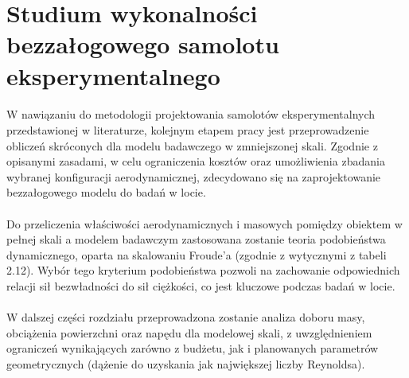 \clearpage
\section{Studium wykonalności bezzałogowego samolotu eksperymentalnego}
    \paragraph{}
        W nawiązaniu do metodologii projektowania samolotów eksperymentalnych przedstawionej w literaturze, 
        kolejnym etapem pracy jest przeprowadzenie obliczeń skróconych dla modelu badawczego w zmniejszonej skali. 
        Zgodnie z opisanymi zasadami, w celu ograniczenia kosztów oraz umożliwienia zbadania wybranej konfiguracji aerodynamicznej, 
        zdecydowano się na zaprojektowanie bezzałogowego modelu do badań w locie.
    \paragraph{}
        Do przeliczenia właściwości aerodynamicznych i masowych pomiędzy obiektem w pełnej skali 
        a modelem badawczym zastosowana zostanie teoria podobieństwa dynamicznego, oparta na skalowaniu Froude’a 
        (zgodnie z wytycznymi z tabeli 2.12). 
        Wybór tego kryterium podobieństwa pozwoli na zachowanie odpowiednich relacji sił bezwładności do sił ciężkości, 
        co jest kluczowe podczas badań w locie.
    \paragraph{}
        W dalszej części rozdziału przeprowadzona zostanie analiza doboru masy,
        obciążenia powierzchni oraz napędu dla modelowej skali, 
        z uwzględnieniem ograniczeń wynikających zarówno z budżetu, 
        jak i planowanych parametrów geometrycznych (dążenie do uzyskania jak największej liczby Reynoldsa).